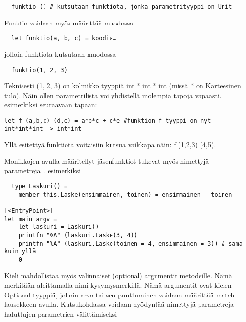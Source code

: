 \begin{lstlisting}
  funktio () # kutsutaan funktiota, jonka parametrityyppi on Unit
\end{lstlisting}

Funktio voidaan myös määrittää muodossa~\cite{msn_params}

\begin{lstlisting}
  let funktio(a, b, c) = koodia…
\end{lstlisting}

jolloin funktiota kutsutaan muodossa

\begin{lstlisting}
  funktio(1, 2, 3)
\end{lstlisting}

Teknisesti (1, 2, 3) on kolmikko tyyppiä int * int * int (missä * on Karteesinen tulo). Näin ollen parametrilista voi yhdistellä molempia tapoja vapaasti, esimerkiksi seuraavaan tapaan:

\begin{lstlisting}
let f (a,b,c) (d,e) = a*b*c + d*e #funktion f tyyppi on nyt int*int*int -> int*int
\end{lstlisting}

Yllä esitettyä funktiota voitaisiin kutsua vaikkapa näin: f (1,2,3) (4,5).

Monikkojen avulla määritellyt jäsenfunktiot tukevat myös nimettyjä parametreja~\cite{msn_params}, esimerkiksi

\begin{lstlisting}
  type Laskuri() =
    member this.Laske(ensimmainen, toinen) = ensimmainen - toinen

[<EntryPoint>]
let main argv =
    let laskuri = Laskuri()
    printfn "%A" (laskuri.Laske(3, 4))
    printfn "%A" (laskuri.Laske(toinen = 4, ensimmainen = 3)) # sama kuin yllä
    0
\end{lstlisting}

Kieli mahdollistaa myös valinnaiset (optional) argumentit metodeille. Nämä merkitään aloittamalla nimi kysymysmerkillä. Nämä argumentit ovat kielen Optional-tyyppiä, jolloin arvo
tai sen puuttuminen voidaan määrittää match-lausekkeen avulla. Kutsukohdassa voidaan hyödyntää nimettyjä parametreja haluttujen parametrien välittämiseksi

